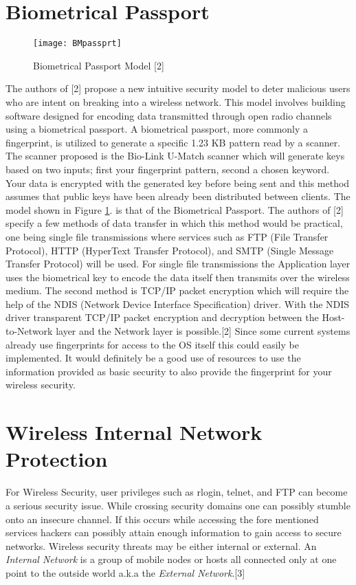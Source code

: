 \documentclass[11pt,onecolumn,cspaper,compsoc]{IEEEtran}
\begin{document}
\section{Biometrical Passport}

\begin{figure}[!t]
  \centering
  \texttt{[image: BMpassprt]}
  \caption{Biometrical Passport Model [2]}
  \label{BMP}
\end{figure}

The authors of [2] propose a new intuitive security model to deter malicious users who are intent on breaking into a wireless network. 
This model involves building software designed for encoding data transmitted through open radio channels using a biometrical passport. 
A biometrical passport, more commonly a fingerprint, is utilized to generate a specific 1.23 KB pattern read by a 
scanner. The scanner proposed is the Bio-Link U-Match scanner which will generate keys based on two inputs; first your fingerprint pattern, 
second a chosen keyword. Your data is encrypted with the generated key before being sent and this method assumes that public keys have been 
already been distributed between clients. The model shown in Figure \ref{BMP}. is that of the Biometrical Passport. The authors of [2] specify 
a few methods of data transfer in which this method would be practical, one being single file transmissions where services such as FTP (File 
Transfer Protocol), HTTP (HyperText Transfer Protocol), and SMTP (Single Message Transfer Protocol) will be used. For single file 
transmissions the Application layer uses the biometrical key to encode the data itself then transmits over the wireless medium. The second 
method is TCP/IP packet encryption which will require the help of the NDIS (Network Device Interface Specification) driver. With the NDIS 
driver transparent TCP/IP packet encryption and decryption between the Host-to-Network layer and the Network layer is possible.[2] Since some 
current systems already use fingerprints for access to the OS itself this could easily be implemented. It would definitely be a good use of 
resources to use the information provided as basic security to also provide the fingerprint for your wireless security.

\section{Wireless Internal Network Protection}

For Wireless Security, user privileges such as rlogin, telnet, and FTP can become a serious security issue. While crossing security 
domains one can possibly stumble onto an insecure channel. If this occurs while accessing the fore mentioned services hackers can possibly 
attain enough information to gain access to secure networks. Wireless security threats may be either internal or external. An 
\textit{Internal Network} is a group of mobile nodes or hosts all connected only at one point to the outside world a.k.a the \textit{External Network}.[3]
\end{document}
